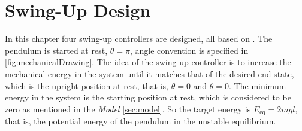 \chapter{Swing-Up Design}\label{sec:swing-upDesign}
In this chapter four swing-up controllers are designed, all based on \cite{kjAastrom}. The pendulum is started at rest, $\theta = \pi$, angle convention is specified in \autoref{fig:mechanicalDrawing}. The idea of the swing-up controller is to increase the mechanical energy in the system until it matches that of the desired end state, which is the upright position at rest, that is, $\theta = 0$ and $\dot{\theta} = 0$. The minimum energy in the system is the starting position at rest, which is considered to be zero as mentioned in the \textit{Model} \autoref{sec:model}. So the target energy is $E_{\mathrm{eq}} = 2 m g l$, that is, the potential energy of the pendulum in the unstable equilibrium.

